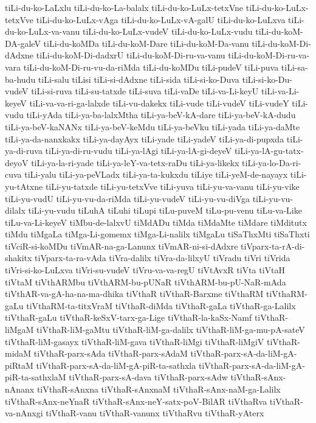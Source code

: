 {tiLi-du-ko-LaLxlu
tiLi-du-ko-La-balalx
tiLi-du-ko-LuLx-tetxVne
tiLi-du-ko-LuLx-tetxVve
tiLi-du-ko-LuLx-vAga
tiLi-du-ko-LuLx-vA-galU
tiLi-du-ko-LuLxva
tiLi-du-ko-LuLx-va-vanu
tiLi-du-ko-LuLx-vudeV
tiLi-du-ko-LuLx-vudu
tiLi-du-koM-DA-galeV
tiLi-du-koMDa
tiLi-du-koM-Dare
tiLi-du-koM-Da-vanu
tiLi-du-koM-Di-dAdxne
tiLi-du-koM-Di-dadxrU
tiLi-du-koM-Di-ru-va-vanu
tiLi-du-koM-Di-ru-va-vara
tiLi-du-koM-Di-ru-vu-da-riMda
tiLi-du-koMDu
tiLi-pudeV
tiLi-puva
tiLi-sa-ba-hudu
tiLi-salu
tiLisi
tiLi-si-dAdxne
tiLi-sida
tiLi-si-ko-Duva
tiLi-si-ko-Du-vudeV
tiLi-si-ruva
tiLi-su-tatxde
tiLi-suva
tiLi-vaDe
tiLi-va-Li-keyU
tiLi-va-Li-keyeV
tiLi-va-va-ri-ga-lalxde
tiLi-vu-dakekx
tiLi-vude
tiLi-vudeV
tiLi-vudeY
tiLi-vudu
tiLi-yAda
tiLi-ya-ba-lalxMtha
tiLi-ya-beV-kA-dare
tiLi-ya-beV-kA-dudu
tiLi-ya-beV-kaNANx
tiLi-ya-beV-keMdu
tiLi-ya-beVku
tiLi-yada
tiLi-ya-daMte
tiLi-ya-da-nanxkakx
tiLi-ya-dayAyx
tiLi-yade
tiLi-yadeV
tiLi-ya-di-pupxda
tiLi-ya-di-ruva
tiLi-ya-di-ru-vudu
tiLi-ya-lAgi
tiLi-ya-lA-gi-deyeV
tiLi-ya-lA-gu-tatx-deyoV
tiLi-ya-la-ri-yade
tiLi-ya-leY-va-tetx-raDu
tiLi-ya-likekx
tiLi-ya-lo-Da-ri-cuva
tiLi-yalu
tiLi-ya-peVLadx
tiLi-ya-ta-kukxdu
tiLiye
tiLi-yeM-de-nayayx
tiLi-yu-tAtxne
tiLi-yu-tatxde
tiLi-yu-tetxVve
tiLi-yuva
tiLi-yu-va-vanu
tiLi-yu-vike
tiLi-yu-vudU
tiLi-yu-vu-da-riMda
tiLi-yu-vudeV
tiLi-yu-vu-diVga
tiLi-yu-vu-dilalx
tiLi-yu-vudu
tiLuhA
tiLuhi
tiLupi
tiLu-puveM
tiLu-pu-venu
tiLu-va-Like
tiLu-va-Li-keyeV
tiMbu-de-lalxvU
tiMdADu
tiMda
tiMdaMte
tiMdare
tiMditutx
tiMdu
tiMgaLa
tiMga-Li-gomemx
tiMga-Li-nalilx
tiMgaLu
tiSaThxMti
tiSaThxti
tiVciR-si-koMDu
tiVmAR-na-ga-Lanunx
tiVmAR-ni-si-dAdxre
tiVparx-ta-rA-di-shakitx
tiVparx-ta-ra-vAda
tiVra-dalilx
tiVra-da-lilxyU
tiVradu
tiVri
tiVrida
tiVri-si-ko-LuLxva
tiVri-su-vudeV
tiVru-va-va-regU
tiVtAvxR
tiVta
tiVtaH
tiVtaM
tiVthARMbu
tiVthARM-bu-pUNaR
tiVthARM-bu-pU-NaR-mAda
tiVthAR-va-gA-ha-na-ma-dhika
tiVthaR
tiVthaR-Barxme
tiVthaRM
tiVthaRM-gaLu
tiVthaRM-ta-titxVraM
tiVthaR-diMda
tiVthaR-gaLa
tiVthaR-ga-Lalilx
tiVthaR-gaLu
tiVthaR-keSxV-tarx-ga-Lige
tiVthaR-la-kaSx-Namf
tiVthaR-liMgaM
tiVthaR-liM-gaMtu
tiVthaR-liM-ga-dalilx
tiVthaR-liM-ga-mu-pA-sateV
tiVthaR-liM-gasayx
tiVthaR-liM-gava
tiVthaR-liMgi
tiVthaR-liMgiV
tiVthaR-midaM
tiVthaR-parx-sAda
tiVthaR-parx-sAdaM
tiVthaR-parx-sA-da-liM-gA-piRtaM
tiVthaR-parx-sA-da-liM-gA-piR-ta-sathxla
tiVthaR-parx-sA-da-liM-gA-piR-ta-sathxlaM
tiVthaR-parx-sA-dava
tiVthaR-parx-sAdw
tiVthaR-sAnx-nAnanx
tiVthaR-sAnxna
tiVthaR-sAnxnaM
tiVthaR-sAnx-naM-ga-Lalilx
tiVthaR-sAnx-neYnaR
tiVthaR-sAnx-neY-satx-poV-BilAR
tiVthaRva
tiVthaR-va-nAnxgi
tiVthaR-vanu
tiVthaR-vanunx
tiVthaRvu
tiVthaR-yAterx
}
